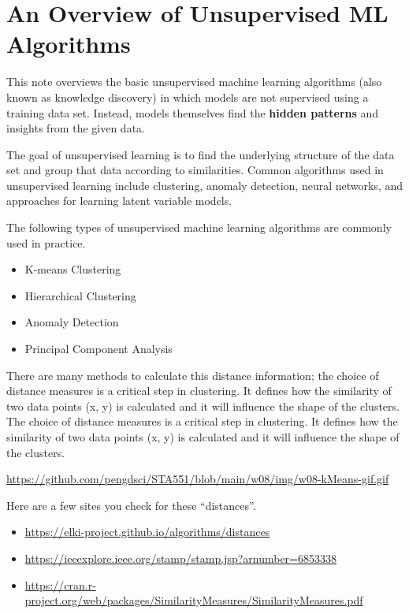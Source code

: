 \documentclass[
]{book}
\providecommand{\tightlist}{%
  \setlength{\itemsep}{0pt}\setlength{\parskip}{0pt}}
\begin{document}
\hfill\break

\hypertarget{an-overview-of-unsupervised-ml-algorithms}{%
\chapter{An Overview of Unsupervised ML Algorithms}\label{an-overview-of-unsupervised-ml-algorithms}}

This note overviews the basic unsupervised machine learning algorithms (also known as knowledge discovery) in which models are not supervised using a training data set. Instead, models themselves find the \textbf{hidden patterns} and insights from the given data.

The goal of unsupervised learning is to find the underlying structure of the data set and group that data according to similarities. Common algorithms used in unsupervised learning include clustering, anomaly detection, neural networks, and approaches for learning latent variable models.

The following types of unsupervised machine learning algorithms are commonly used in practice.

\begin{itemize}
\tightlist
\item
  K-means Clustering
\item
  Hierarchical Clustering
\item
  Anomaly Detection
\item
  Principal Component Analysis
\end{itemize}

There are many methods to calculate this distance information; the choice of distance measures is a critical step in clustering. It defines how the similarity of two data points (x, y) is calculated and it will influence the shape of the clusters. The choice of distance measures is a critical step in clustering. It defines how the similarity of two data points (x, y) is calculated and it will influence the shape of the clusters.

\url{https://github.com/pengdsci/STA551/blob/main/w08/img/w08-kMeans-gif.gif}

Here are a few sites you check for these ``distances''.

\begin{itemize}
\tightlist
\item
  \url{https://elki-project.github.io/algorithms/distances}
\item
  \url{https://ieeexplore.ieee.org/stamp/stamp.jsp?arnumber=6853338}
\item
  \url{https://cran.r-project.org/web/packages/SimilarityMeasures/SimilarityMeasures.pdf}
\end{itemize}
\end{document}
